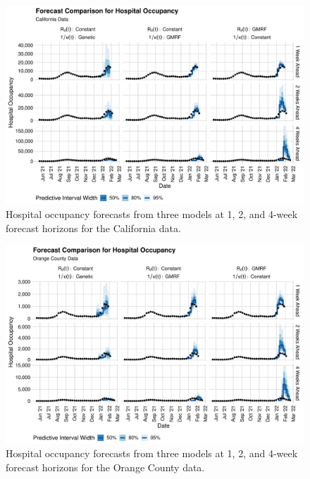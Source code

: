 \begin{figure}
    \centering
    \includegraphics[width=1.0\columnwidth]{real_data_forecast_comparison_data_hospitalizations_California_plot}
    \caption[Hospital occupancy forecasts for California data.]{Hospital occupancy forecasts from three models at 1, 2, and 4-week forecast horizons for the California data.}
    \label{ch_5:fig:real_data_forecast_comparison_data_hospitalizations_California_plot}
\end{figure}

\begin{figure}
    \centering
    \includegraphics[width=1.0\columnwidth]{real_data_forecast_comparison_data_hospitalizations_Orange_plot}
    \caption[Hospital occupancy forecasts for Orange County data.]{Hospital occupancy forecasts from three models at 1, 2, and 4-week forecast horizons for the Orange County data.}
    \label{ch_5:fig:real_data_forecast_comparison_data_hospitalizations_Orange_plot}
\end{figure}


